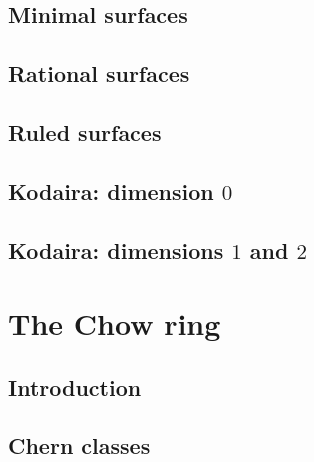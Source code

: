 \documentclass [11 pt, oneside] {article}
\begin{document}
\subsection{Minimal surfaces}
\subsection{Rational surfaces}
\subsection{Ruled surfaces}
\subsection{Kodaira: dimension \texorpdfstring{$0$}{0}}
\subsection{Kodaira: dimensions \texorpdfstring{$1$ and $2$}{1 and 2}}


\section{The Chow ring}
\subsection{Introduction}
\subsection{Chern classes}

\printindex
\end{document}

